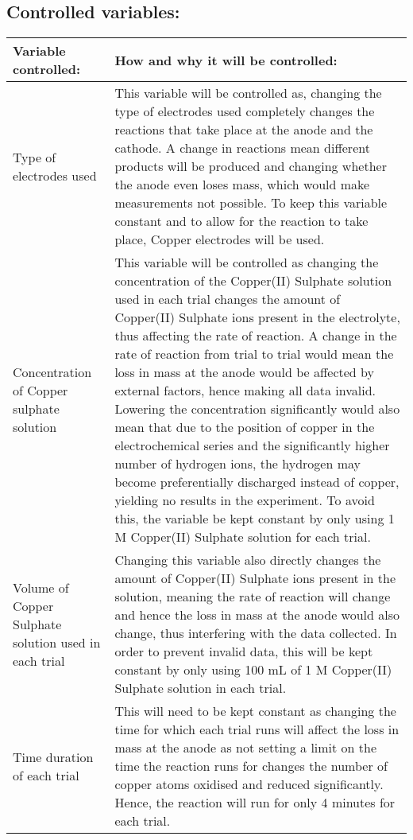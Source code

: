 \documentclass[11pt, a4]{article}
\begin{document}
		\subsection{Controlled variables:}
			\begin{longtable}{|>{\centering\arraybackslash}m{4.5cm}|>{\centering\arraybackslash}m{10.5cm}|}
				\hline
				\textbf{Variable controlled:} & \textbf{How and why it will be controlled:}\\
				\hline
				\hline
				Type of electrodes used & This variable will be controlled as, changing the type of electrodes used completely changes the reactions that take place at the anode and the cathode. A change in reactions mean different products will be produced and changing whether the anode even loses mass, which would make measurements not possible. To keep this variable constant and to allow for the reaction to take place, Copper electrodes will be used.\\
				\hline
				Concentration of Copper sulphate solution & This variable will be controlled as changing the concentration of the Copper(II) Sulphate solution used in each trial changes the amount of Copper(II) Sulphate ions present in the electrolyte, thus affecting the rate of reaction. A change in the rate of reaction from trial to trial would mean the loss in mass at the anode would be affected by external factors, hence making all data invalid. Lowering the concentration significantly would also mean that due to the position of copper in the electrochemical series and the significantly higher number of hydrogen ions, the hydrogen may become preferentially discharged instead of copper, yielding no results in the experiment. To avoid this, the variable be kept constant by only using 1 M Copper(II) Sulphate solution for each trial.\\
				\hline
				Volume of Copper Sulphate solution used in each trial & Changing this variable also directly changes the amount of Copper(II) Sulphate ions present in the solution, meaning the rate of reaction will change and hence the loss in mass at the anode would also change, thus interfering with the data collected. In order to prevent invalid data, this will be kept constant by only using 100 mL of 1 M Copper(II) Sulphate solution in each trial.\\
				\hline
				Time duration of each trial & This will need to be kept constant as changing the time for which each trial runs will affect the loss in mass at the anode as not setting a limit on the time the reaction runs for changes the number of copper atoms oxidised and reduced significantly. Hence, the reaction will run for only 4 minutes for each trial.\\

\end{longtable}
\end{document}
